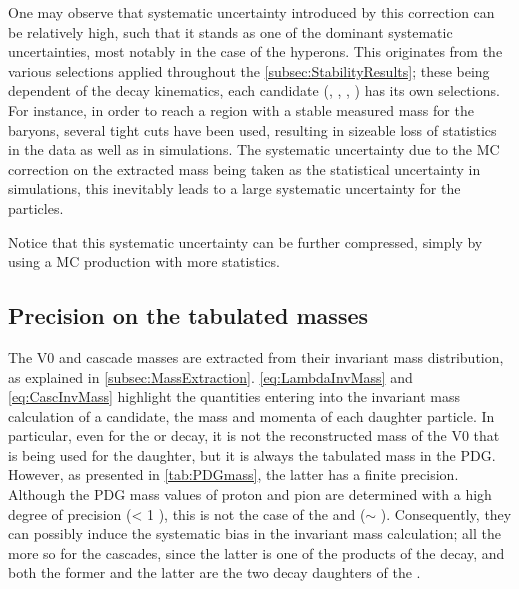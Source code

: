 One may observe that systematic uncertainty introduced by this correction can be relatively high, such that it stands as one of the dominant systematic uncertainties, most notably in the case of the \rmXi hyperons. This originates from the various selections applied throughout the \Sec\ref{subsec:StabilityResults}; these being dependent of the decay kinematics, each candidate (\rmKzeroS, \rmLambda, \rmXi, \rmOmega) has its own selections. For instance, in order to reach a region with a stable measured mass for the \rmXi baryons, several tight cuts have been used, resulting in sizeable loss of statistics in the data as well as in simulations. The systematic uncertainty due to the MC correction on the extracted mass being taken as the statistical uncertainty in simulations, this inevitably leads to a large systematic uncertainty for the \rmXi particles. 

Notice that this systematic uncertainty can be further compressed, simply by using a MC production with more statistics.

\subsection{Precision on the tabulated masses}

The V0 and cascade masses are extracted from their invariant mass distribution, as explained in \Sec\ref{subsec:MassExtraction}. \Eq\ref{eq:LambdaInvMass} and \ref{eq:CascInvMass} highlight the quantities entering into the invariant mass calculation of a candidate, \ie the mass and momenta of each daughter particle. In particular, even for the \rmXiPM or \rmOmegaPM decay, it is not the reconstructed mass of the V0 that is being used for the \rmLambdaPM daughter, but it is always the tabulated mass in the PDG. However, as presented in \tab\ref{tab:PDGmass}, the latter has a finite precision. Although the PDG mass values of proton and pion are determined with a high degree of precision (\sigmaPDG < 1 \kmass), this is not the case of the \rmKPM and \rmLambdaPM (\sigmaPDG $\sim$ \kmass). Consequently, they can possibly induce the systematic bias in the invariant mass calculation; all the more so for the cascades, since the latter is one of the products of the \rmXi decay, and both the former and the latter are the two decay daughters of the \rmOmega. 

